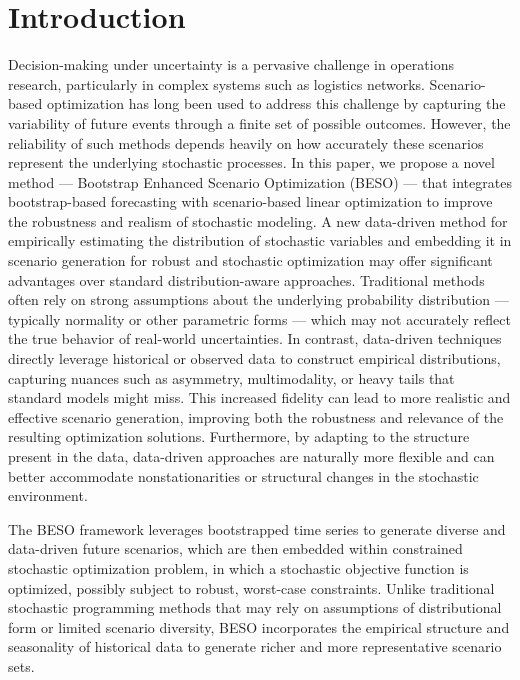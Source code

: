 \documentclass[opre,sglanonrev,11pt]{informs4}
\begin{document}

\maketitle
\section{Introduction} \label{Sec:intro}

Decision-making under uncertainty is a pervasive challenge in operations research, particularly in complex systems such as logistics networks. Scenario-based optimization has long been used to address this challenge by capturing the variability of future events through a finite set of possible outcomes. However, the reliability of such methods depends heavily on how accurately these scenarios represent the underlying stochastic processes. In this paper, we propose a novel method — Bootstrap Enhanced Scenario Optimization (BESO) — that integrates bootstrap-based forecasting with scenario-based linear optimization to improve the robustness and realism of stochastic modeling. A new data-driven method for empirically estimating the distribution of stochastic variables and embedding it in scenario generation for robust and stochastic optimization may offer significant advantages over standard distribution-aware approaches. Traditional methods often rely on strong assumptions about the underlying probability distribution — typically normality or other parametric forms — which may not accurately reflect the true behavior of real-world uncertainties. In contrast, data-driven techniques directly leverage historical or observed data to construct empirical distributions, capturing nuances such as asymmetry, multimodality, or heavy tails that standard models might miss. This increased fidelity can lead to more realistic and effective scenario generation, improving both the robustness and relevance of the resulting optimization solutions. Furthermore, by adapting to the structure present in the data, data-driven approaches are naturally more flexible and can better accommodate nonstationarities or structural changes in the stochastic environment.

The BESO framework leverages bootstrapped time series to generate diverse and data-driven future scenarios, which are then embedded within constrained stochastic optimization problem, in which a stochastic objective function is optimized, possibly subject to robust, worst-case constraints. Unlike traditional stochastic programming methods that may rely on assumptions of distributional form or limited scenario diversity, BESO incorporates the empirical structure and seasonality of historical data to generate richer and more representative scenario sets.
\end{document}
